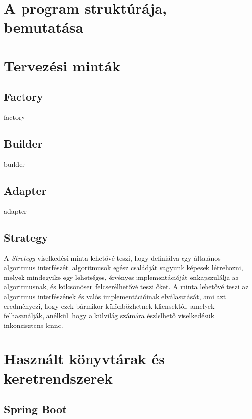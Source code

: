 \section{A program struktúrája, bemutatása}

\section{Tervezési minták}

\subsection{Factory}

factory

\subsection{Builder}

builder

\subsection{Adapter}

adapter

\subsection{Strategy}

A \emph{Strategy} viselkedési minta lehetővé teszi, hogy definiálva egy általános algoritmus interfészét, algoritmusok egész családját vagyunk képesek létrehozni, melyek mindegyike egy lehetséges, érvényes implementációját enkapszulálja az algoritmusnak, és kölcsönösen felcserélhetővé teszi őket. A minta lehetővé teszi az algoritmus interfészének és valós implementációinak elválasztását, ami azt eredményezi, hogy ezek bármikor különbözhetnek kliensektől, amelyek felhasználják, anélkül, hogy a külvilág számára észlelhető viselkedésük inkonzisztens lenne. \par



\section{Használt könyvtárak és keretrendszerek}



\subsection{Spring Boot}

